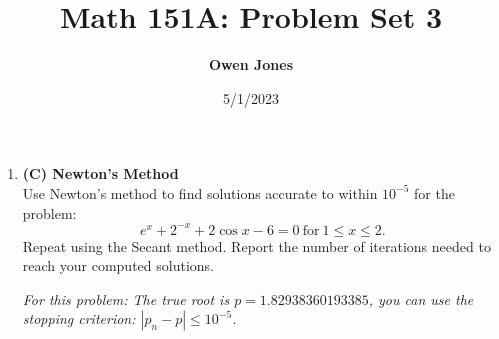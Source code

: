 \documentclass[12pt]{article}
\title{\bf Math 151A: Problem Set 3}
\date{5/1/2023}
\author{\bf Owen Jones}
\begin{document}
\maketitle

\vspace{1em}

\begin{enumerate}[label=\bfseries Problem \arabic*:]

 \item \textbf{(C) Newton's Method}\\
  Use Newton's method to find solutions accurate to within $10^{-5}$ for the problem:
$$e^x +2^{-x} +2 \cos{x}-6=0 \ \text{for} \  1\leq x \leq 2.$$
 Repeat using the Secant method. Report the number of iterations needed to reach your computed solutions. 
 
 \textit{For this problem:  The true root is $p=1.82938360193385$, you can use the stopping criterion: $|p_n-p|\leq 10^{-5}$. }


\end{enumerate}
\end{document}
